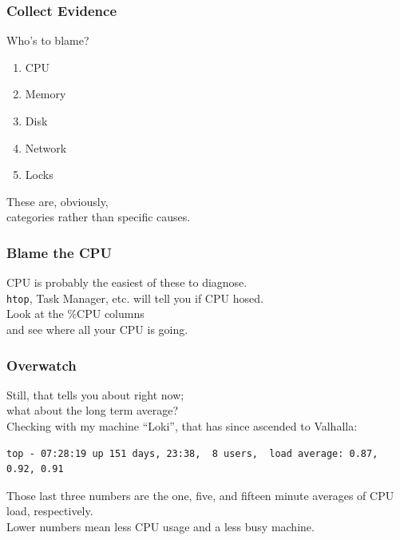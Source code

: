\begin{frame}
\frametitle{Collect Evidence}


\begin{changemargin}{1cm}
Who's to blame?
\begin{enumerate}
	\item CPU
	\item Memory
	\item Disk
	\item Network
	\item Locks
\end{enumerate}

These are, obviously, \\
categories rather than specific causes.
\end{changemargin}
\end{frame}



\begin{frame}
\frametitle{Blame the CPU}


\begin{changemargin}{1cm}
CPU is probably the easiest of these to diagnose. \\[1em]
\texttt{htop}, Task Manager, etc. will tell you if CPU hosed.\\
Look at the \%CPU columns\\
and see where all your CPU is going. 
\end{changemargin}


\end{frame}



\begin{frame}[fragile]
\frametitle{Overwatch}


\begin{changemargin}{1cm}
Still, that tells you about right now; \\
what about the long term average? \\[1em]

Checking with my machine ``Loki'', that has since ascended to Valhalla:\\[1em]

{\scriptsize
\begin{verbatim}
top - 07:28:19 up 151 days, 23:38,  8 users,  load average: 0.87, 0.92, 0.91
\end{verbatim}
}

Those last three numbers are the one, five, and fifteen minute averages of CPU load, respectively. \\[1em]

Lower numbers mean less CPU usage and a less busy machine. 
\end{changemargin}

\end{frame}




